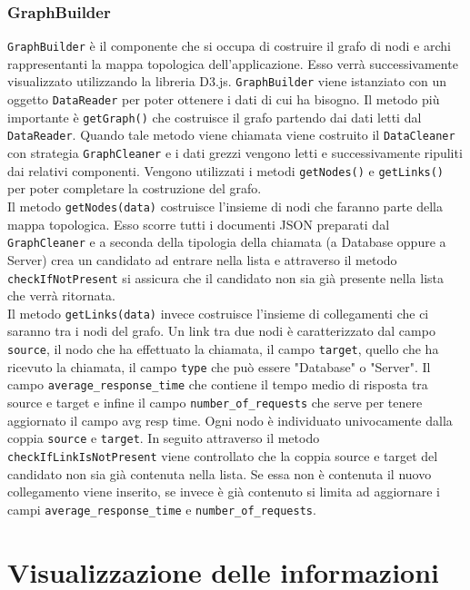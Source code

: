 \subsubsection{GraphBuilder}
\label{sec:GraphBuilder}
	\texttt{GraphBuilder} è il componente che si occupa di costruire il grafo di nodi e archi rappresentanti la mappa topologica dell'applicazione. Esso verrà successivamente visualizzato utilizzando la libreria D3.js. \texttt{GraphBuilder} viene istanziato con un oggetto \texttt{DataReader} per poter ottenere i dati di cui ha bisogno. Il metodo più importante è \texttt{getGraph()} che costruisce il grafo partendo dai dati letti dal \texttt{DataReader}. Quando tale metodo viene chiamata viene costruito il \texttt{DataCleaner} con strategia \texttt{GraphCleaner} e i dati grezzi vengono letti e successivamente ripuliti dai relativi componenti.
	Vengono utilizzati i metodi \texttt{getNodes()} e \texttt{getLinks()} per poter completare la costruzione del grafo.\\
	Il metodo \texttt{getNodes(data)} costruisce l'insieme di nodi che faranno parte della mappa topologica. Esso scorre tutti i documenti JSON preparati dal \texttt{GraphCleaner} e a seconda della tipologia della chiamata (a Database oppure a Server) crea un candidato ad entrare nella lista e attraverso il metodo \texttt{checkIfNotPresent} si assicura che il candidato non sia già presente nella lista che verrà ritornata.\\
	Il metodo \texttt{getLinks(data)} invece costruisce l'insieme di collegamenti che ci saranno tra i nodi del grafo. Un link tra due nodi è caratterizzato dal campo \texttt{source}, il nodo che ha effettuato la chiamata, il campo \texttt{target}, quello che ha ricevuto la chiamata, il campo \texttt{type} che può essere "Database" o "Server". Il campo \texttt{average\_response\_time} che contiene il tempo medio di risposta tra source e target e infine il campo \texttt{number\_of\_requests} che serve per tenere aggiornato il campo avg resp time. Ogni nodo è individuato univocamente dalla coppia \texttt{source} e \texttt{target}.
	In seguito attraverso il metodo \texttt{checkIfLinkIsNotPresent} viene controllato che la coppia source e target del candidato non sia già contenuta nella lista. Se essa non è contenuta il nuovo collegamento viene inserito, se invece è già contenuto si limita ad aggiornare i campi \texttt{average\_response\_time} e \texttt{number\_of\_requests}. 

\section{Visualizzazione delle informazioni}

